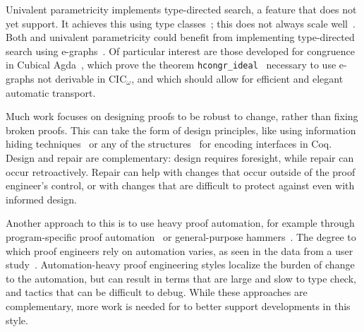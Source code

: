 Univalent parametricity implements type-directed search, a feature that \toolname does not yet support.
It achieves this using type classes~\cite{Sozeau2008}; this does not always scale well~\cite{tabareau2019marriage}.
Both \toolname and univalent parametricity could benefit from implementing type-directed search using e-graphs~\cite{egraph1}.
Of particular interest are those developed for congruence in Cubical Agda~\cite{egraph6},
which prove the theorem \lstinline{hcongr_ideal}~\cite{egraph7} necessary to use e-graphs not derivable in CIC$_{\omega}$,
and which should allow for efficient and elegant automatic transport.

Much work focuses on designing proofs
to be robust to change, rather than fixing broken proofs.
This can take the form of design principles, like using 
information hiding techniques~\cite{Woos:2016:PCF:2854065.2854081, Klein:2014:CFV:2584468.2560537}
or any of the structures~\cite{Chrzaszcz2003, Sozeau2008, Saibi:PhD} for encoding interfaces in Coq.
Design and repair are complementary: design requires foresight, while repair can occur retroactively.
Repair can help with changes that occur outside of the proof engineer's control,
or with changes that are difficult to protect against even with informed design.

Another approach to this is to use heavy proof automation, for example through
program-specific proof automation~\cite{Chlipala:2013:CPD:2584504}
or general-purpose hammers~\cite{Blanchette2016b, Blanchette2013, Kaliszyk2014, Czajka2018}.
The degree to which proof engineers rely on automation varies, as seen in the data from a user study~\cite{replica}.
Automation-heavy proof engineering styles localize the burden of change to the automation,
but can result in terms that are large and slow to type check,
and tactics that can be difficult to debug.
While these approaches are complementary, more work is needed for \toolname to better support 
developments in this style.



